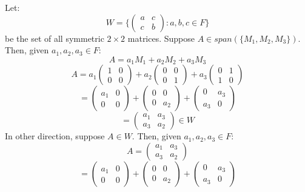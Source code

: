 \documentclass{article}
\begin{document}
Let:
\begin{equation*}
    W = \Bigg\{ \begin{pmatrix} a & c \\ c & b \end{pmatrix} : a, b, c \in F \Bigg\}
\end{equation*}
be the set of all symmetric \(2 \times 2\) matrices. Suppose \(A \in span(\{M_{1}, M_{2}, M_{3}\})\). Then, given \(a_{1}, a_{2}, a_{3} \in F\):
\begin{equation*}
    A = a_{1}M_{1} + a_{2}M_{2} + a_{3}M_{3}
\end{equation*}
\begin{equation*}
    A = a_{1}\begin{pmatrix} 1 & 0\\ 0 & 0 \end{pmatrix} + a_{2}\begin{pmatrix} 0 & 0\\ 0 & 1 \end{pmatrix} + a_{3}\begin{pmatrix} 0 & 1\\ 1 & 0 \end{pmatrix}
\end{equation*}
\begin{equation*}
    = \begin{pmatrix} a_{1} & 0\\ 0 & 0 \end{pmatrix} + \begin{pmatrix} 0 & 0\\ 0 & a_{2} \end{pmatrix} + \begin{pmatrix} 0 & a_{3}\\ a_{3} & 0 \end{pmatrix}
\end{equation*}
\begin{equation*}
    = \begin{pmatrix} a_{1} & a_{3}\\ a_{3} & a_{2} \end{pmatrix} \in W
\end{equation*}
In other direction, suppose \(A \in W\). Then, given \(a_{1}, a_{2}, a_{3} \in F\):
\begin{equation*}
    A = \begin{pmatrix} a_{1} & a_{3} \\ a_{3} & a_{2} \end{pmatrix}
\end{equation*}
\begin{equation*}
    = \begin{pmatrix} a_{1} & 0\\ 0 & 0 \end{pmatrix} + \begin{pmatrix} 0 & 0\\ 0 & a_{2} \end{pmatrix} + \begin{pmatrix} 0 & a_{3}\\ a_{3} & 0 \end{pmatrix}
\end{equation*}
\end{document}
